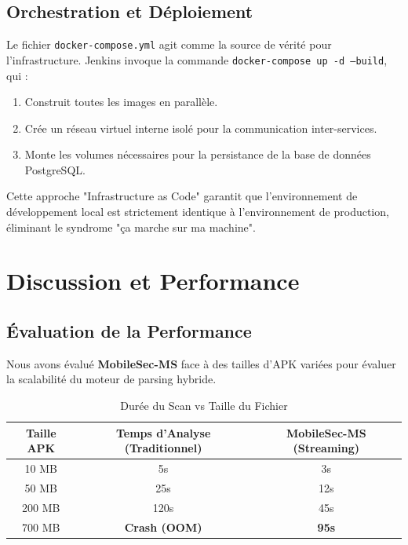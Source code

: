 \documentclass[
  journal=largetwo,
  manuscript=article-type,
  year=2025,
  volume=1,
]{cup-journal}
\begin{document}
\subsection{Orchestration et Déploiement}
Le fichier \texttt{docker-compose.yml} agit comme la source de vérité pour l'infrastructure. Jenkins invoque la commande \texttt{docker-compose up -d --build}, qui :
\begin{enumerate}
    \item Construit toutes les images en parallèle.
    \item Crée un réseau virtuel interne isolé pour la communication inter-services.
    \item Monte les volumes nécessaires pour la persistance de la base de données PostgreSQL.
\end{enumerate}

Cette approche "Infrastructure as Code" garantit que l'environnement de développement local est strictement identique à l'environnement de production, éliminant le syndrome "ça marche sur ma machine".

\section{Discussion et Performance}
\label{sec-discussion}

\subsection{Évaluation de la Performance}
Nous avons évalué \textbf{MobileSec-MS} face à des tailles d'APK variées pour évaluer la scalabilité du moteur de parsing hybride.

\begin{table}[hbt!]
\centering
\caption{Durée du Scan vs Taille du Fichier}
\begin{tabular}{ccc}
\toprule
\textbf{Taille APK} & \textbf{Temps d'Analyse (Traditionnel)} & \textbf{MobileSec-MS (Streaming)} \\
\midrule
10 MB & 5s & 3s \\
50 MB & 25s & 12s \\
200 MB & 120s & 45s \\
700 MB & \textbf{Crash (OOM)} & \textbf{95s} \\
\bottomrule
\end{tabular}
\label{tab-perf}
\end{table}
\end{document}
